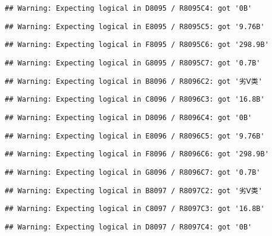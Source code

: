 \documentclass[
]{article}
\begin{document}
\begin{verbatim}
## Warning: Expecting logical in D8095 / R8095C4: got '0B'
\end{verbatim}

\begin{verbatim}
## Warning: Expecting logical in E8095 / R8095C5: got '9.76B'
\end{verbatim}

\begin{verbatim}
## Warning: Expecting logical in F8095 / R8095C6: got '298.9B'
\end{verbatim}

\begin{verbatim}
## Warning: Expecting logical in G8095 / R8095C7: got '0.7B'
\end{verbatim}

\begin{verbatim}
## Warning: Expecting logical in B8096 / R8096C2: got '劣Ⅴ类'
\end{verbatim}

\begin{verbatim}
## Warning: Expecting logical in C8096 / R8096C3: got '16.8B'
\end{verbatim}

\begin{verbatim}
## Warning: Expecting logical in D8096 / R8096C4: got '0B'
\end{verbatim}

\begin{verbatim}
## Warning: Expecting logical in E8096 / R8096C5: got '9.76B'
\end{verbatim}

\begin{verbatim}
## Warning: Expecting logical in F8096 / R8096C6: got '298.9B'
\end{verbatim}

\begin{verbatim}
## Warning: Expecting logical in G8096 / R8096C7: got '0.7B'
\end{verbatim}

\begin{verbatim}
## Warning: Expecting logical in B8097 / R8097C2: got '劣Ⅴ类'
\end{verbatim}

\begin{verbatim}
## Warning: Expecting logical in C8097 / R8097C3: got '16.8B'
\end{verbatim}

\begin{verbatim}
## Warning: Expecting logical in D8097 / R8097C4: got '0B'
\end{verbatim}
\end{document}
